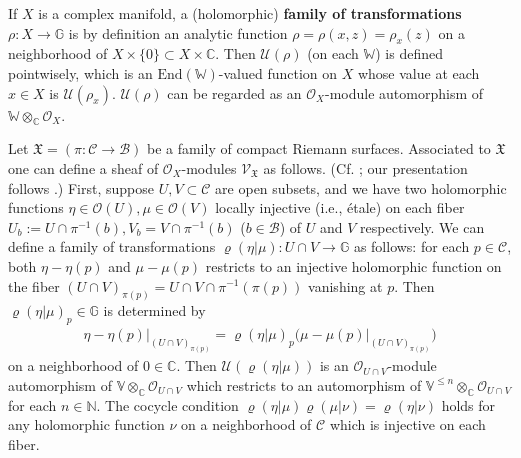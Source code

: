 \documentclass[12pt,a4paper,notitlepage]{article}
\theoremstyle{definition}
\theoremstyle{plain}
\newcommand{\fk}{\mathfrak}
\newcommand{\mc}{\mathcal}
\newcommand{\End}{\mathrm{End}} %
\newcommand{\scr}{\mathscr}
\newcommand{\Vbb}{\mathbb V}
\newcommand{\Wbb}{\mathbb W}
\newcommand{\Gbb}{\mathbb G}
\newcommand{\Cbb}{\mathbb C}
\newcommand{\Nbb}{\mathbb N}
\numberwithin{equation}{section}
\begin{document}
If $X$ is a complex manifold,  a (holomorphic) \textbf{family of transformations} $\rho:X\rightarrow\Gbb$ is by definition an analytic function $\rho=\rho(x,z)=\rho_x(z)$ on a neighborhood of  $X\times\{0\}\subset X\times\Cbb$. Then $\mc U(\rho)$ (on each $\Wbb$) is defined pointwisely, which is an $\End(\Wbb)$-valued function on $X$ whose value at each $x\in X$ is $\mc U(\rho_x)$. $\mc U(\rho)$ can be regarded as an $\scr O_X$-module automorphism of $\Wbb\otimes_\Cbb\scr O_X$. 


Let $\fk X=(\pi:\mc C\rightarrow\mc B)$ be a family of compact Riemann surfaces. Associated to $\fk X$ one can define a sheaf of $\scr O_X$-modules $\scr V_{\fk X}$ as follows. (Cf. \cite[Chapter 6, 17]{FB04}; our presentation follows \cite[Sec. 5]{Gui20}.) First, suppose $U,V\subset\mc C$ are open subsets, and we have two holomorphic functions $\eta\in\scr O(U),\mu\in\scr O(V)$ locally injective (i.e., \'etale) on  each fiber $U_b:=U\cap\pi^{-1}(b),V_b=V\cap\pi^{-1}(b)$ ($b\in\mc B$) of $U$ and $V$ respectively. We can define a family of transformations $\varrho(\eta|\mu):U\cap V\rightarrow\Gbb$  as follows: for each $p\in\mc C$, both $\eta-\eta(p)$ and $\mu-\mu(p)$ restricts to an injective holomorphic function on the fiber $(U\cap V)_{\pi(p)}=U\cap V\cap\pi^{-1}(\pi(p))$ vanishing at $p$. Then $\varrho(\eta|\mu)_p\in\Gbb$ is determined by 
\begin{align}
\boxed{~\eta-\eta(p)\big|_{(U\cap V)_{\pi(p)}}	=\varrho(\eta|\mu)_p\big(\mu-\mu(p)\big|_{(U\cap V)_{\pi(p)}}\big)~}\label{eq10}
\end{align}
on a neighborhood of $0\in\Cbb$. Then $\mc U(\varrho(\eta|\mu))$ is an $\scr O_{U\cap V}$-module automorphism of $\Vbb\otimes_\Cbb\scr O_{U\cap V}$ which restricts to an automorphism of $\Vbb^{\leq n}\otimes_\Cbb\scr O_{U\cap V}$ for each $n\in\Nbb$. The cocycle condition $\varrho(\eta|\mu)\varrho(\mu|\nu)=\varrho(\eta|\nu)$ holds for any holomorphic function $\nu$ on a neighborhood of $\mc C$ which is injective on each fiber. 
\end{document}
